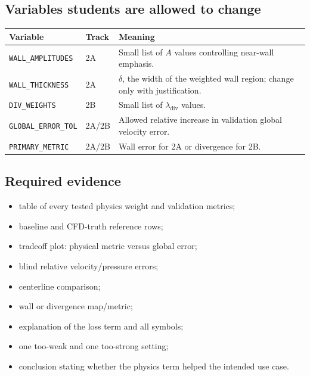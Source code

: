 \documentclass[11pt]{article}
\begin{document}
\subsection{Variables students are allowed to change}
\begin{tabularx}{\textwidth}{@{}p{}p{}Y@{}}
\toprule
\textbf{Variable} & \textbf{Track} & \textbf{Meaning}\\
\midrule
\texttt{WALL\_AMPLITUDES} & 2A & Small list of $A$ values controlling near-wall emphasis.\\
\texttt{WALL\_THICKNESS} & 2A & $\delta$, the width of the weighted wall region; change only with justification.\\
\texttt{DIV\_WEIGHTS} & 2B & Small list of $\lambda_{\mathrm{div}}$ values.\\
\texttt{GLOBAL\_ERROR\_TOL} & 2A/2B & Allowed relative increase in validation global velocity error.\\
\texttt{PRIMARY\_METRIC} & 2A/2B & Wall error for 2A or divergence for 2B.\\
\bottomrule
\end{tabularx}

\subsection{Required evidence}
\begin{itemize}
\item table of every tested physics weight and validation metrics;
\item baseline and CFD-truth reference rows;
\item tradeoff plot: physical metric versus global error;
\item blind relative velocity/pressure errors;
\item centerline comparison;
\item wall or divergence map/metric;
\item explanation of the loss term and all symbols;
\item one too-weak and one too-strong setting;
\item conclusion stating whether the physics term helped the intended use case.
\end{itemize}
\end{document}
